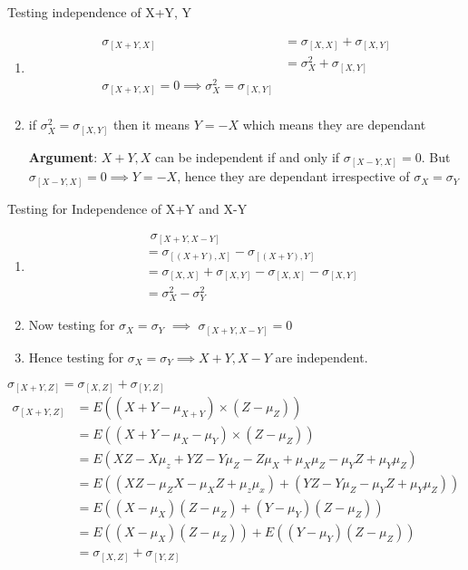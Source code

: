 \documentclass[10pt]{beamer}
\begin{document}
\begin{frame}{Testing independence of X+Y, Y}
\begin{enumerate}
\item \begin{align*}
   \sigma_{[X+Y,X]} &= \sigma_{[X,X]} + \sigma_{[X,Y]}\\
                    &= \sigma_{X}^2 + \sigma_{[X,Y]}\\
                    \sigma_{[X+Y,X]} = 0 \implies \sigma_{X}^2 = \sigma_{[X,Y]}\\
\end{align*}
\item if $\sigma_{X}^2 = \sigma_{[X,Y]}$ then it means $Y=-X$ which means they are dependant\\
\begin{tcolorbox}
\large \textbf{Argument}: \small $X+Y, X$ can be independent if and only if  $\sigma_{[X-Y,X]} = 0$. But $\sigma_{[X-Y,X]} = 0 \implies Y=-X$, hence they are dependant irrespective of $\sigma_X = \sigma_Y$
\end{tcolorbox}
\end{enumerate}
\end{frame}

\begin{frame}{Testing for Independence of X+Y and X-Y}
\begin{enumerate}
\item \begin{align*}
& \hspace{5pt} \sigma_{[X+Y, X-Y]}\\
&= \sigma_{[(X+Y), X]}- \sigma_{[(X+Y), Y]} \\
&= \sigma_{[X,X]} + \sigma_{[X,Y]} - \sigma_{[X,X]} - \sigma_{[X,Y]}  \\
&= \sigma_X^2 - \sigma_Y^2
\end{align*}
\item Now testing for $\sigma_X = \sigma_Y $ $\implies$ $\sigma_{[X+Y,X-Y]}= 0$
\item Hence testing for   $\sigma_X = \sigma_Y \implies X+Y, X-Y$ are independent.
\end{enumerate}
\end{frame}

\begin{frame}{$\sigma_{[X+Y,Z]} = \sigma_{[X,Z]} + \sigma_{[Y,Z]}$}
    \begin{align*}
        \sigma_{[X+Y,Z]} &= E((X+Y - \mu_{X+Y}) \times (Z -\mu_{Z} ))\\
        &= E((X+Y - \mu_{X}-\mu_{Y}) \times (Z -\mu_{Z} ))\\
        &= E(XZ-X\mu_z+YZ-Y\mu_Z-Z\mu_X+\mu_X\mu_Z-\mu_YZ+\mu_Y\mu_Z)\\
        &= E((XZ-\mu_ZX-\mu_XZ+\mu_z\mu_x) + (YZ-Y\mu_Z-\mu_YZ+\mu_Y\mu_Z))\\
        &= E((X-\mu_X)(Z-\mu_Z)+ (Y-\mu_Y)(Z-\mu_Z))\\
        &= E((X-\mu_X)(Z-\mu_Z)) + E((Y-\mu_Y)(Z-\mu_Z))\\
        &=\sigma_{[X,Z]} + \sigma_{[Y,Z]}\\
    \end{align*}
\end{frame}
\end{document}
